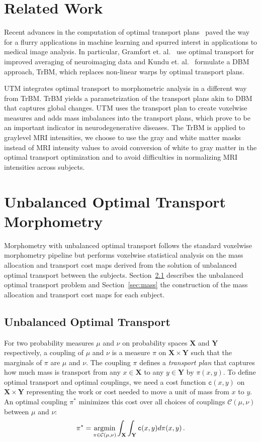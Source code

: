 \documentclass{llncs}
\newcommand{\cost}[0]{\mathtt{c}}
\newcommand{\coupling}[0]{\pi}
\def\argmin{\mathop{\rm argmin}}
\newcommand{\Xsp}{{\mathbf{X}}}
\newcommand{\Ysp}{{\mathbf{Y}}}
\begin{document}
\section{Related Work}
Recent advances in the computation of optimal transport
plans~\cite{cuturi2013sinkhorn,gerber2017multiscale} paved the way for a flurry
applications in machine learning and spurred interst in applications to medical
image analysis. In particular, Gramfort et.  al.~\cite{gramfort2015fast} use
optimal transport for improved averaging of neuroimaging data and Kundu et.
al.~\cite{kundu2018discovery} formulate a DBM approach, TrBM, which replaces
non-linear warps by optimal transport plans. 

UTM integrates optimal transport to morphometric analysis in a different way
from TrBM.  TrBM yields a parametrization of the transport plans akin to DBM
that captures global changes. UTM uses the transport plan to create voxelwise
measures and adds mass imbalances into the transport plans, which prove to be
an important indicator in neurodegenerative diseases.  The TrBM is applied to
graylevel MRI intensities, we choose to use the gray and white matter masks
instead of MRI intensity values to avoid conversion of white to gray matter in
the optimal transport optimization and to avoid difficulties in normalizing MRI
intensities across subjects. 


\section{Unbalanced Optimal Transport Morphometry}
\label{sec:methods}
Morphometry with unbalanced optimal transport follows the standard voxelwise
morphometry pipeline but performs voxelwise statistical analysis on the mass
allocation and transport cost maps derived from the solution of unbalanced
optimal transport between the subjects. Section~\ref{sec:unbalanced} describes
the unbalanced optimal transport problem and Section~\ref{sec:mass} the
construction of the mass allocation and transport cost maps for each subject.

\subsection{Unbalanced Optimal Transport}
\label{sec:unbalanced}
For two probability measures $\mu$ and $\nu$ on probability spaces ${\Xsp}$
and ${\Ysp}$ respectively, a coupling of $\mu$ and $\nu$ is a measure
$\coupling$ on ${\Xsp}\times{\Ysp}$ such that the marginals of $\coupling$ are
$\mu$ and $\nu$. The coupling $\coupling$ defines a {\em transport plan} that
captures how much mass is transport from any $x \in \Xsp$ to  any $y \in \Ysp$
by $\coupling(x, y)$. To define optimal transport and optimal couplings, we
need a cost function $\cost(x,y)$ on ${\Xsp}\times{\Ysp}$ representing the work
or cost needed to move a unit of mass from $x$ to $y$. An optimal coupling
$\coupling^*$ minimizes this cost over all choices of couplings
$\mathcal{C}(\mu,\nu)$ between
$\mu$ and $\nu$: 
\begin{equation}
  \coupling^*= \argmin_{\coupling\in\mathcal{C}(\mu,\nu)} \int_{{\Xsp}}\int_{{\Ysp}}
\cost(x,y)  d\coupling(x,y) \,.  
\end{equation}
\end{document}
